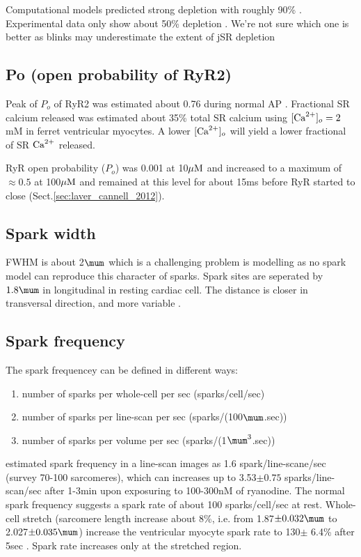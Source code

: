 Computational models predicted strong depletion with roughly 90\%
\citep{sobie2002tcas, Ramay2010}.  Experimental data only show about 50\%
depletion \citep{brochet2005, Terentyev2008}. We're not sure which one is better
as blinks may underestimate the extent of jSR depletion


\subsection{Po (open probability of RyR2)}


Peak of $P_o$ of RyR2 was estimated about 0.76 during normal AP
\citep{jafri1998cad}. Fractional SR calcium released was estimated about 35\%
total SR calcium \citep{bassani1995fsr} using $[{\text{Ca}^{2+}}]_o=2$mM in ferret
ventricular myocytes. A lower $[{\text{Ca}^{2+}}]_o$ will yield a lower fractional of SR
${\text{Ca}^{2+}}$ released. 

RyR open probability ($P_o$) was 0.001 at 10${\mu\text{M}}$ and increased to a maximum of
$\approx 0.5$ at 100${\mu\text{M}}$ and remained at this level for
about 15ms before RyR started to close \citep{laver2012}
(Sect.\ref{sec:laver_cannell_2012}).

\subsection{Spark width}

FWHM is about 2$\mum$ which is a challenging problem is modelling as no spark
model can reproduce this character of sparks. Spark sites are seperated by
$1.8\mum$ in longitudinal in resting cardiac cell. The distance is closer in
transversal direction, and more variable \citep{parker1996csi}.


\subsection{Spark frequency}

The spark frequencey can be defined in different ways: 
\begin{enumerate}
  \item number of sparks per whole-cell per sec (sparks/cell/sec)
  \item number of sparks per line-scan per sec (sparks/(100$\mum$.sec))
  \item number of sparks per volume per sec (sparks/(1$\mum^3$.sec))
\end{enumerate}

\citep{cheng1993cse} estimated spark frequency in a line-scan images as 1.6
spark/line-scane/sec (survey 70-100 sarcomeres), which can increases up to
3.53$\pm 0.75$ sparks/line-scan/sec after 1-3min upon exposuring to 100-300nM of
ryanodine. The normal spark frequency suggests a spark rate of about 100
sparks/cell/sec at rest. Whole-cell stretch (sarcomere length increase about
8\%, i.e. from 1.87$\pm 0.032\mum$ to 2.027$\pm 0.035\mum$) increase the
ventricular myocyte spark rate to 130$\pm$ 6.4\% after 5sec \citep{iribe2009}.
Spark rate increases only at the stretched region.

